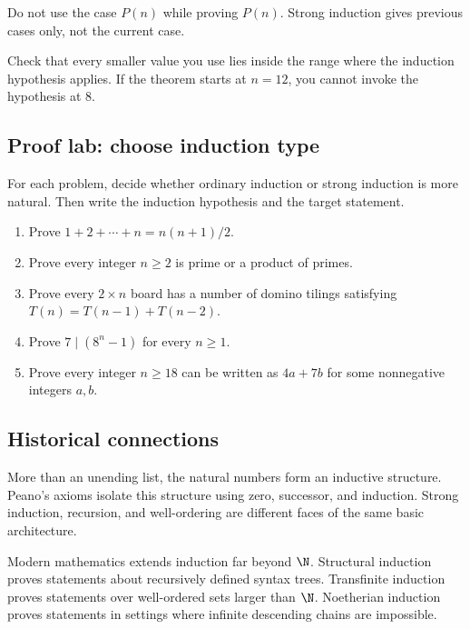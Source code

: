 \begin{trapbox}
Do not use the case $P(n)$ while proving $P(n)$. Strong induction gives previous cases only, not the current case.
\end{trapbox}

\begin{trapbox}
Check that every smaller value you use lies inside the range where the induction hypothesis applies. If the theorem starts at $n=12$, you cannot invoke the hypothesis at $8$.
\end{trapbox}

\subsection{Proof lab: choose induction type}

\begin{labbox}
For each problem, decide whether ordinary induction or strong induction is more natural. Then write the induction hypothesis and the target statement.

\begin{enumerate}
\item Prove $1+2+\cdots+n=n(n+1)/2$.
\item Prove every integer $n\geq2$ is prime or a product of primes.
\item Prove every $2\times n$ board has a number of domino tilings satisfying $T(n)=T(n-1)+T(n-2)$.
\item Prove $7\mid(8^n-1)$ for every $n\geq1$.
\item Prove every integer $n\geq18$ can be written as $4a+7b$ for some nonnegative integers $a,b$.
\end{enumerate}
\end{labbox}

\subsection{Historical connections}

\begin{historybox}
More than an unending list, the natural numbers form an inductive structure. Peano's axioms isolate this structure using zero, successor, and induction. Strong induction, recursion, and well-ordering are different faces of the same basic architecture.
\end{historybox}

Modern mathematics extends induction far beyond $\N$. Structural induction proves statements about recursively defined syntax trees. Transfinite induction proves statements over well-ordered sets larger than $\N$. Noetherian induction proves statements in settings where infinite descending chains are impossible.

